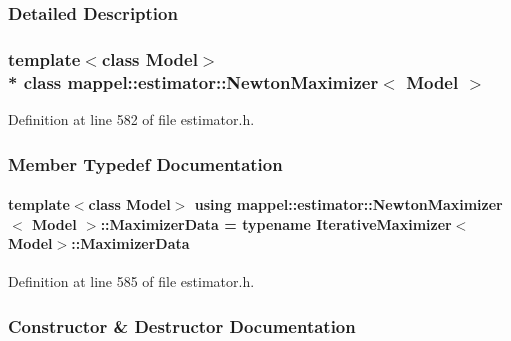 \subsubsection{Detailed Description}
\subsubsection*{template$<$class Model$>$\\*
class mappel\+::estimator\+::\+Newton\+Maximizer$<$ Model $>$}



Definition at line 582 of file estimator.\+h.



\subsubsection{Member Typedef Documentation}
\paragraph[{\texorpdfstring{Maximizer\+Data}{MaximizerData}}]{\setlength{\rightskip}{0pt plus 5cm}template$<$class Model$>$ using {\bf mappel\+::estimator\+::\+Newton\+Maximizer}$<$ Model $>$\+::{\bf Maximizer\+Data} =  typename {\bf Iterative\+Maximizer}$<$Model$>$\+::{\bf Maximizer\+Data}}\hypertarget{classmappel_1_1estimator_1_1NewtonMaximizer_a0389811392d2d22092f57936cef8a628}{}\label{classmappel_1_1estimator_1_1NewtonMaximizer_a0389811392d2d22092f57936cef8a628}


Definition at line 585 of file estimator.\+h.



\subsubsection{Constructor \& Destructor Documentation}
